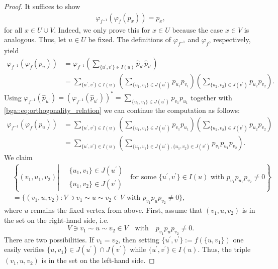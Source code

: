 \documentclass[10pt,a4paper]{amsart}
\begin{document}
\begin{proof}
    It suffices to show 
    \begin{align*}
        \varphi_{f^{-1}}(\varphi_f(p_x)) = p_x,
    \end{align*}
    for all $x \in U \cup V$. Indeed, we only prove this for $x \in U$ because the case $x \in V$ is analogous. Thus, let $u \in U$ be fixed.
    The definitions of $\varphi_{f^{-1}}$ and $\varphi_f$, respectively, yield 
    \begin{align*}
        \varphi_{f^{-1}}(\varphi_f(p_u))
            &= \varphi_{f^{-1}}\left( \sum_{\{u^\prime, v^\prime\} \in I(u)} \hat{p}_{u^\prime} \hat{p}_{v^\prime} \right) \\
            &= \sum_{\{u^\prime, v^\prime\} \in I(u)} \left( \sum_{\{u_1, v_1\} \in J(u^\prime)} p_{u_1} p_{v_1} \right) \left( \sum_{\{u_2, v_2\} \in J(v^\prime)} p_{u_2} p_{v_2} \right).
    \end{align*}
    Using $\varphi_{f^{-1}}(\hat{p}_{u^\prime}) = \left(\varphi_{f^{-1}}(\hat{p}_{u^\prime})\right)^\ast = \sum_{\{u_1, v_1\} \in J(u^\prime)} p_{v_1} p_{u_1}$ together with \eqref{bga::eq:orthogonality_relation} we can continue the computation as follows:
    \begin{align*}
        \varphi_{f^{-1}}(\varphi_f(p_u))
            &= \sum_{\{u^\prime, v^\prime\} \in I(u)} \left( \sum_{\{u_1, v_1\} \in J(u^\prime)}  p_{v_1} p_{u_1}\right) \left( \sum_{\{u_2, v_2\} \in J(v^\prime)} p_{u_2} p_{v_2} \right) \\
            &= \sum_{\{u^\prime, v^\prime\} \in I(u)} \left( \sum_{\{u_1, v_1\} \in J(u^\prime), \{u_1, v_2\} \in J(v^\prime)} p_{v_1} p_{u_1} p_{v_2} \right).
    \end{align*}
    We claim
    \begin{align*} 
        &\left\{(v_1, u_1, v_2) \left| \;
            \begin{aligned}
                &\{u_1, v_1\} \in J(u^\prime) \\
                &\{u_1, v_2\} \in J(v^\prime)
            \end{aligned} \;
                \text{ for some } \{u^\prime, v^\prime\} \in I(u)
                \text{ with } p_{v_1} p_{u_1} p_{v_2} \neq 0 
            \right. \right\} \\
        &=\{(v_1, u, v_2): V \ni v_1 \sim u \sim v_2 \in V \text{ with } p_{v_1} p_u p_{v_2} \neq 0 \},
    \end{align*}
    where $u$ remains the fixed vertex from above.
    First, assume that $(v_1, u, v_2)$ is in the set on the right-hand side, i.e. 
    $$ V \ni v_1 \sim u \sim v_2 \in V \quad \text{with} \quad p_{v_1} p_u p_{v_2} \neq 0. $$ 
    There are two possibilities. If $v_1 = v_2$, then setting $\{u^\prime, v^\prime\} := f(\{u, v_1\})$ one easily verifies $\{u, v_1\} \in J(u^\prime) \cap J(v^\prime)$ while $\{u^\prime, v^\prime\} \in I(u)$. Thus, the triple $(v_1, u, v_2)$ is in the set on the left-hand side.
    

\end{proof}
\end{document}
